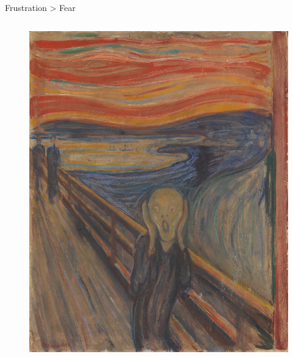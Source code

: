 \documentclass{beamer}
\begin{document}
\begin{frame}{Frustration >  Fear}
\begin{columns}
\begin{figure}
\includegraphics[width=1.05\textwidth,height=1.05\textheight,keepaspectratio]{Figures/Munchjpg.jpg}
\end{figure}
\end{columns}
\end{frame}

\end{document}
